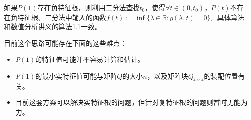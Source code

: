 \documentclass[UTF8]{ctexart}
\theoremstyle{plain}
\theoremstyle{definition}
\theoremstyle{remark}
\begin{document}
如果$P(1)$存在负特征根，则利用二分法查找$t_{0}$，使得$\forall t\in(0,t_{0})$，$P(t)$不存在负特征根。二分法中输入的函数$f(t):=\inf\{\lambda\in\mathbb{R}:g(\lambda,t)=0\}$，具体算法和数值分析讲义的算法1.1一致。

目前这个思路可能存在下面的这些难点：
\begin{itemize}
    \item $P(1)$的特征值可能并不容易计算和估计。
    \item $P(1)$的最小实特征值可能与矩阵$Q$的大小$n$，以及矩阵块$Q_{4\times 4}$的装配位置有关。
    \item 目前这套方案可以解决实特征根的问题，但针对复特征根的问题则暂时无能为力。
\end{itemize}
\end{document}
